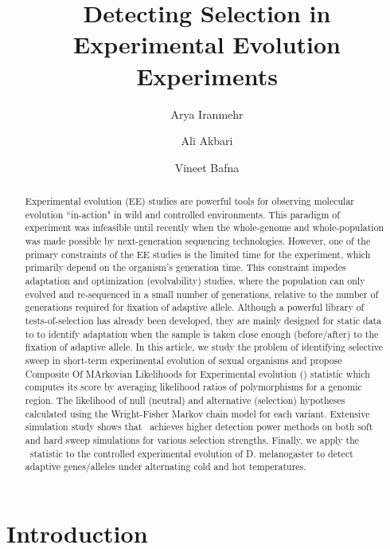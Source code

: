 \documentclass[11pt]{article}
\title{Detecting Selection in Experimental Evolution Experiments}
\author[1]{Arya Iranmehr}
\author[1]{Ali Akbari}
\author[2]{Vineet Bafna}
\affil[1]{\footnotesize Electrical and Computer Engineering, University of California, San Diego, La Jolla, CA 92093, USA.}
\affil[2]{\footnotesize Computer Science \& Engineering, University of California, San Diego, La Jolla, CA 92093, USA}
\date{}
\def\comale{\text{COMALE }}
\begin{document}
\maketitle
\begin{abstract}
Experimental evolution (EE) studies are powerful tools for observing
molecular evolution ``in-action" in wild and controlled environments. This 
paradigm of experiment was infeasible until recently when the whole-genome 
and whole-population was made possible by next-generation sequencing 
technologies. 
However, one of the primary constraints of the EE studies 
is the limited time for the experiment, which primarily depend on the 
organism's 
generation 
time. This constraint impedes adaptation and optimization (evolvability) 
studies, where the population 
can only evolved and re-sequenced in a small number of generations, 
relative to the number of generations required for fixation of adaptive 
allele. 
Although a 
powerful library of tests-of-selection has already been developed, they are 
mainly designed for static data to
to identify adaptation when the sample is taken close enough (before/after) 
to the fixation of adaptive allele.
In this article, we study the problem of identifying selective sweep in 
short-term experimental evolution of sexual organisms and  propose Composite 
Of MArkovian Likelihoods for Experimental evolution (\comale) statistic which 
computes its score by 
averaging 
likelihood ratios of polymorphisms for a genomic region. 
The likelihood of null
(neutral) and 
alternative (selection) hypotheses calculated using the Wright-Fisher Markov 
chain model 
for each variant. Extensive simulation study shows that
\comale\ achieves higher detection power methods on both soft and 
hard sweep simulations for various selection strengths. 
Finally, we apply the \comale\ statistic to the controlled experimental 
evolution of D. melanogaster to detect adaptive genes/alleles under alternating 
cold and hot temperatures.
\end{abstract}



\section{Introduction}
\end{document}
